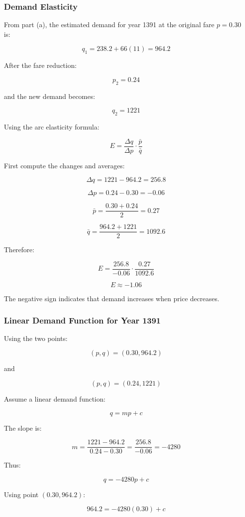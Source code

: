 \documentclass{KPS_assignment}
\begin{document}
\subsubsection{Demand Elasticity}

From part (a), the estimated demand for year 1391 at the original fare $p=0.30$ is:

\[
q_1 = 238.2+66(11)=964.2
\]

After the fare reduction:

\[
p_2=0.24
\]

and the new demand becomes:

\[
q_2=1221
\]

Using the arc elasticity formula:

\[
E=
\frac{\Delta q}{\Delta p}
\cdot
\frac{\bar p}{\bar q}
\]

First compute the changes and averages:

\[
\Delta q = 1221-964.2 = 256.8
\]

\[
\Delta p = 0.24-0.30 = -0.06
\]

\[
\bar p = \frac{0.30+0.24}{2}=0.27
\]

\[
\bar q = \frac{964.2+1221}{2}=1092.6
\]

Therefore:

\[
E=
\frac{256.8}{-0.06}
\cdot
\frac{0.27}{1092.6}
\]

\[
\boxed{
E \approx -1.06
}
\]

The negative sign indicates that demand increases when price decreases.



\subsubsection{Linear Demand Function for Year 1391}

Using the two points:

\[
(p,q)=(0.30,964.2)
\]

and

\[
(p,q)=(0.24,1221)
\]

Assume a linear demand function:

\[
q=mp+c
\]

The slope is:

\[
m=
\frac{1221-964.2}{0.24-0.30}
=
\frac{256.8}{-0.06}
=-4280
\]

Thus:

\[
q=-4280p+c
\]

Using point $(0.30,964.2)$:

\[
964.2=-4280(0.30)+c
\]
\end{document}
